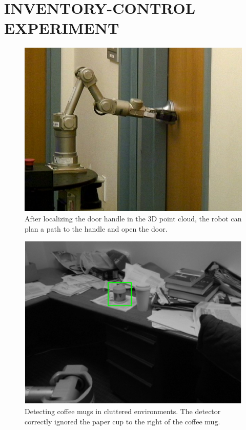 \documentclass[letterpaper, 10 pt, conference]{ieeeconf}  %
\begin{document}
\section{INVENTORY-CONTROL EXPERIMENT}

\begin{figure}[t]
\begin{center}
  \includegraphics[width=0.95\linewidth]{opening_door.jpg}
\end{center}
\caption{After localizing the door handle in the 3D point cloud, the robot can plan a path to the handle and open the door.}
\label{fig:opening_door}
\end{figure}

\begin{figure}[t]
\begin{center}
  \includegraphics[width=0.8\linewidth]{mug_found3.png}
\end{center}
\caption{Detecting coffee mugs in cluttered environments. The detector correctly ignored the paper cup to the right of the coffee mug.}
\label{fig:mugs_found}
\end{figure}
\end{document}
